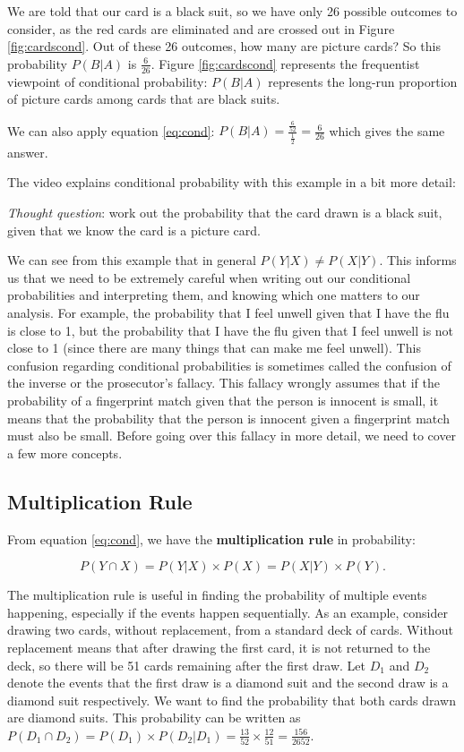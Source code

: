 \documentclass[
]{book}
\begin{document}
We are told that our card is a black suit, so we have only 26 possible outcomes to consider, as the red cards are eliminated and are crossed out in Figure \ref{fig:cardscond}. Out of these 26 outcomes, how many are picture cards? So this probability \(P(B|A)\) is \(\frac{6}{26}\). Figure \ref{fig:cardscond} represents the frequentist viewpoint of conditional probability: \(P(B|A)\) represents the long-run proportion of picture cards among cards that are black suits.

We can also apply equation \eqref{eq:cond}: \(P(B|A) = \frac{\frac{6}{52}}{\frac{1}{2}} = \frac{6}{26}\) which gives the same answer.

The video explains conditional probability with this example in a bit more detail:

\emph{Thought question}: work out the probability that the card drawn is a black suit, given that we know the card is a picture card.

We can see from this example that in general \(P(Y|X) \neq P(X|Y)\). This informs us that we need to be extremely careful when writing out our conditional probabilities and interpreting them, and knowing which one matters to our analysis. For example, the probability that I feel unwell given that I have the flu is close to 1, but the probability that I have the flu given that I feel unwell is not close to 1 (since there are many things that can make me feel unwell). This confusion regarding conditional probabilities is sometimes called the confusion of the inverse or the prosecutor's fallacy. This fallacy wrongly assumes that if the probability of a fingerprint match given that the person is innocent is small, it means that the probability that the person is innocent given a fingerprint match must also be small. Before going over this fallacy in more detail, we need to cover a few more concepts.

\hypertarget{multiplication-rule}{%
\subsection{Multiplication Rule}\label{multiplication-rule}}

From equation \eqref{eq:cond}, we have the \textbf{multiplication rule} in probability:

\begin{equation} 
P(Y \cap X) = P(Y|X) \times P(X) = P(X|Y) \times P(Y).
\label{eq:mult}
\end{equation}

The multiplication rule is useful in finding the probability of multiple events happening, especially if the events happen sequentially. As an example, consider drawing two cards, without replacement, from a standard deck of cards. Without replacement means that after drawing the first card, it is not returned to the deck, so there will be 51 cards remaining after the first draw. Let \(D_1\) and \(D_2\) denote the events that the first draw is a diamond suit and the second draw is a diamond suit respectively. We want to find the probability that both cards drawn are diamond suits. This probability can be written as \(P(D_1 \cap D_2) = P(D_1) \times P(D_2|D_1) = \frac{13}{52} \times \frac{12}{51} = \frac{156}{2652}\).
\end{document}
